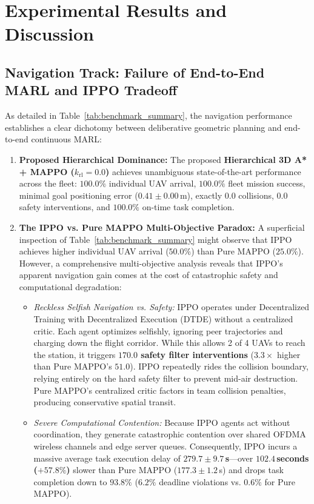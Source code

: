 \documentclass[conference]{IEEEtran}
\begin{document}
\section{Experimental Results and Discussion}
\label{sec:results}

\subsection{Navigation Track: Failure of End-to-End MARL and IPPO Tradeoff}
As detailed in Table~\ref{tab:benchmark_summary}, the navigation performance establishes a clear dichotomy between deliberative geometric planning and end-to-end continuous MARL:
\begin{enumerate}
    \item \textbf{Proposed Hierarchical Dominance:} The proposed \textbf{Hierarchical 3D A* + MAPPO ($k_{\text{rl}}=0.0$)} achieves unambiguous state-of-the-art performance across the fleet: $100.0\%$ individual UAV arrival, $100.0\%$ fleet mission success, minimal goal positioning error ($0.41 \pm 0.00$\,m), exactly $0.0$ collisions, $0.0$ safety interventions, and $100.0\%$ on-time task completion.
    \item \textbf{The IPPO vs. Pure MAPPO Multi-Objective Paradox:} A superficial inspection of Table~\ref{tab:benchmark_summary} might observe that IPPO achieves higher individual UAV arrival ($50.0\%$) than Pure MAPPO ($25.0\%$). However, a comprehensive multi-objective analysis reveals that IPPO's apparent navigation gain comes at the cost of catastrophic safety and computational degradation:
    \begin{itemize}
        \item \textit{Reckless Selfish Navigation vs. Safety:} IPPO operates under Decentralized Training with Decentralized Execution (DTDE) without a centralized critic. Each agent optimizes selfishly, ignoring peer trajectories and charging down the flight corridor. While this allows 2 of 4 UAVs to reach the station, it triggers \textbf{$170.0$ safety filter interventions} ($3.3\times$ higher than Pure MAPPO's $51.0$). IPPO repeatedly rides the collision boundary, relying entirely on the hard safety filter to prevent mid-air destruction. Pure MAPPO's centralized critic factors in team collision penalties, producing conservative spatial transit.
        \item \textit{Severe Computational Contention:} Because IPPO agents act without coordination, they generate catastrophic contention over shared OFDMA wireless channels and edge server queues. Consequently, IPPO incurs a massive average task execution delay of \textbf{$279.7 \pm 9.7$\,s}---over \textbf{$102.4$\,seconds ($+57.8\%$)} slower than Pure MAPPO ($177.3 \pm 1.2$\,s) and drops task completion down to $93.8\%$ ($6.2\%$ deadline violations vs. $0.6\%$ for Pure MAPPO).

\end{itemize}
\end{enumerate}
\end{document}
